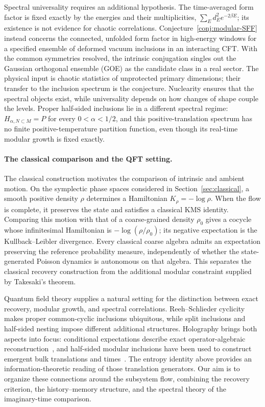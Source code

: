\documentclass[a4paper,11pt]{article}
\theoremstyle{definition}
\begin{document}
Spectral universality requires an additional hypothesis. The time-averaged form factor is fixed exactly by the energies and their multiplicities, $\sum_E d_E^2e^{-2\beta E}$; its existence is not evidence for chaotic correlations. Conjecture~\ref{conj:modular-SFF} instead concerns the connected, unfolded form factor in high-energy windows for a specified ensemble of deformed vacuum inclusions in an interacting CFT. With the common symmetries resolved, the intrinsic conjugation singles out the Gaussian orthogonal ensemble (GOE) as the candidate class in a real sector. The physical input is chaotic statistics of unprotected primary dimensions; their transfer to the inclusion spectrum is the conjecture. Nuclearity ensures that the spectral objects exist, while universality depends on how changes of shape couple the levels. Proper half-sided inclusions lie in a different spectral regime: $H_{\alpha,N\subset M}=P$ for every $0<\alpha<1/2$, and this positive-translation spectrum has no finite positive-temperature partition function, even though its real-time modular growth is fixed exactly.

\paragraph{The classical comparison and the QFT setting.}
The classical construction motivates the comparison of intrinsic and ambient motion. On the symplectic phase spaces considered in Section~\ref{sec:classical}, a smooth positive density $\rho$ determines a Hamiltonian $K_\rho=-\log\rho$. When the flow is complete, it preserves the state and satisfies a classical KMS identity. Comparing this motion with that of a coarse-grained density $\rho_0$ gives a cocycle whose infinitesimal Hamiltonian is $-\log(\rho/\rho_0)$; its negative expectation is the Kullback--Leibler divergence. Every classical coarse algebra admits an expectation preserving the reference probability measure, independently of whether the state-generated Poisson dynamics is autonomous on that algebra. This separates the classical recovery construction from the additional modular constraint supplied by Takesaki's theorem.

Quantum field theory supplies a natural setting for the distinction between exact recovery, modular growth, and spectral correlations. Reeh--Schlieder cyclicity makes proper common-cyclic inclusions ubiquitous, while split inclusions and half-sided nesting impose different additional structures. Holography brings both aspects into focus: conditional expectations describe exact operator-algebraic reconstruction~\cite{Faulkner2020}, and half-sided modular inclusions have been used to construct emergent bulk translations and times~\cite{LeutheusserLiu2023}. The entropy identity above provides an information-theoretic reading of those translation generators. Our aim is to organize these connections around the subsystem flow, combining the recovery criterion, the history--memory structure, and the spectral theory of the imaginary-time comparison.
\end{document}
